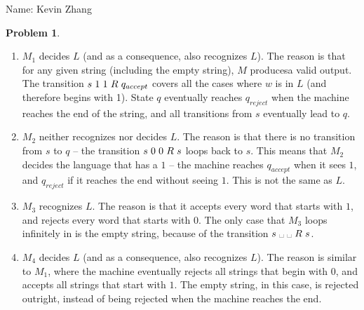\documentclass[11pt]{article}
\newcommand{\yourname}{Kevin Zhang}
\theoremstyle{definition}
\theoremstyle{case}
\theoremstyle{theorem}
\newtheorem{prob}{Problem}
\begin{document}
{\large
\noindent Name: \yourname}

\vspace{15pt}

\begin{prob}\end{prob}

\begin{enumerate}[label=(\alph*)]

\item $M_1$ decides $L$ (and as a consequence, also recognizes $L$). 
The reason is that for any given string (including the empty string), $M$ producesa valid output. 
The transition $s \hspace{3px} 1 \hspace{3px} 1 \hspace{3px} R \hspace{3px} q_{accept}$ covers all the cases where $w$ is in $L$ 
(and therefore begins with 1). State $q$ eventually reaches $q_{reject}$ when the machine
reaches the end of the string, and all transitions from $s$ eventually lead to $q$. 

\item $M_2$ neither recognizes nor decides $L$. The reason is that there is no transition
from $s$ to $q$ -- the transition $s \hspace{3px} 0 \hspace{3px} 0 \hspace{3px} R \hspace{3px} s$ loops back to $s$. This means 
that $M_2$ decides the language that has a $1$ -- the machine reaches $q_{accept}$ when it sees $1$,
and $q_{reject}$ if it reaches the end without seeing $1$. This is not the same as $L$.

\item $M_3$ recognizes $L$. The reason is that it accepts every word that starts with $1$, and 
rejects every word that starts with $0$. The only case that $M_3$ loops infinitely in is
the empty string, because of the transition $s \hspace{3px} \text{\textvisiblespace} \hspace{3px} \text{\textvisiblespace} \hspace{3px} R \hspace{3px} s$.

\item $M_4$ decides $L$ (and as a consequence, also recognizes $L$). The reason is similar
to $M_1$, where the machine eventually rejects all strings that begin with $0$, and accepts
all strings that start with $1$. The empty string, in this case, is rejected outright, instead
of being rejected when the machine reaches the end.

\end{enumerate}
\end{document}
